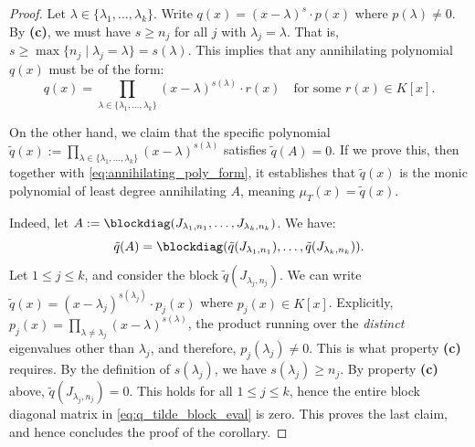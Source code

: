 \begin{proof}
Let $\lambda \in \{ \lambda_1, \dots, \lambda_k \}$. Write $q(x) = (x-\lambda)^s \cdot p(x)$ where $p(\lambda) \neq 0$. By \textbf{(c)}, we must have $s \ge n_j$ for all $j$ with $\lambda_j = \lambda$. That is, $s \ge \max \{ n_j \mid \lambda_j = \lambda \} = s(\lambda)$.
This implies that any annihilating polynomial $q(x)$ must be of the form:
\begin{equation}
\label{eq:annihilating_poly_form}
q(x) = \prod_{\lambda \in \{\lambda_1, \dots, \lambda_k\}} (x-\lambda)^{s(\lambda)} \cdot r(x) \quad \text{for some } r(x) \in K[x].
\end{equation}

On the other hand, we claim that the specific polynomial $\tilde{q}(x) := \prod_{\lambda \in \{\lambda_1, \dots, \lambda_k\}} (x-\lambda)^{s(\lambda)}$ satisfies $\tilde{q}(A) = 0$. If we prove this, then together with \eqref{eq:annihilating_poly_form}, it establishes that $\tilde{q}(x)$ is the monic polynomial of least degree annihilating $A$, meaning $\mu_T(x) = \tilde{q}(x)$.

Indeed, let $A := \blockdiag(J_{\lambda_1, n_1}, \dots, J_{\lambda_k, n_k})$. We have:
\begin{equation}
\label{eq:q_tilde_block_eval}
\tilde{q}(A) = \blockdiag(\tilde{q}(J_{\lambda_1, n_1}), \dots, \tilde{q}(J_{\lambda_k, n_k})).
\end{equation}
Let $1 \le j \le k$, and consider the block $\tilde{q}(J_{\lambda_j, n_j})$. We can write $\tilde{q}(x) = (x-\lambda_j)^{s(\lambda_j)} \cdot p_j(x)$ where $p_j(x) \in K[x]$.
Explicitly, $p_j(x) = \prod_{\lambda \neq \lambda_j} (x-\lambda)^{s(\lambda)}$, the product running over the \emph{distinct} eigenvalues other than $\lambda_j$, and therefore, $p_j(\lambda_j) \neq 0$. This is what property \textbf{(c)} requires.
By the definition of $s(\lambda_j)$, we have $s(\lambda_j) \ge n_j$. By property \textbf{(c)} above, $\tilde{q}(J_{\lambda_j, n_j}) = 0$. This holds for all $1 \le j \le k$, hence the entire block diagonal matrix in \eqref{eq:q_tilde_block_eval} is zero. This proves the last claim, and hence concludes the proof of the corollary.
\end{proof}

